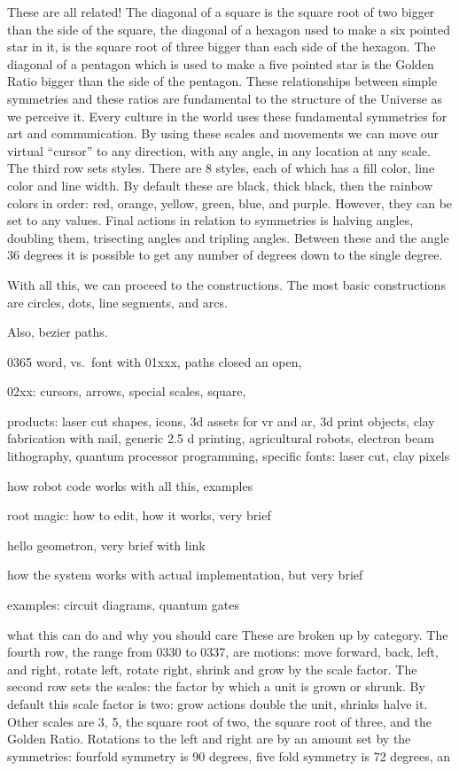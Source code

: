 \documentclass[12pt,a4paper]{amsart}
\numberwithin{equation}{section}
\begin{document}
These are all related! The diagonal of a square is the square root of
two bigger than the side of the square, the diagonal of a hexagon used
to make a six pointed star in it, is the square root of three bigger
than each side of the hexagon. The diagonal of a pentagon which is used
to make a five pointed star is the Golden Ratio bigger than the side of
the pentagon. These relationships between simple symmetries and these
ratios are fundamental to the structure of the Universe as we perceive
it. Every culture in the world uses these fundamental symmetries for art
and communication. By using these scales and movements we can move our
virtual ``cursor'' to any direction, with any angle, in any location at
any scale. The third row sets styles. There are 8 styles, each of which
has a fill color, line color and line width. By default these are black,
thick black, then the rainbow colors in order: red, orange, yellow,
green, blue, and purple. However, they can be set to any values. Final
actions in relation to symmetries is halving angles, doubling them,
trisecting angles and tripling angles. Between these and the angle 36
degrees it is possible to get any number of degrees down to the single
degree.

With all this, we can proceed to the constructions. The most basic
constructions are circles, dots, line segments, and arcs.

Also, bezier paths.

0365 word, vs.~font with 01xxx, paths closed an open,

02xx: cursors, arrows, special scales, square,

products: laser cut shapes, icons, 3d assets for vr and ar, 3d print
objects, clay fabrication with nail, generic 2.5 d printing,
agricultural robots, electron beam lithography, quantum processor
programming, specific fonts: laser cut, clay pixels

how robot code works with all this, examples

root magic: how to edit, how it works, very brief

hello geometron, very brief with link

how the system works with actual implementation, but very brief

examples: circuit diagrams, quantum gates

what this can do and why you should care These are broken up by
category. The fourth row, the range from 0330 to 0337, are motions: move
forward, back, left, and right, rotate left, rotate right, shrink and
grow by the scale factor. The second row sets the scales: the factor by
which a unit is grown or shrunk. By default this scale factor is two:
grow actions double the unit, shrinks halve it. Other scales are 3, 5,
the square root of two, the square root of three, and the Golden Ratio.
Rotations to the left and right are by an amount set by the symmetries:
fourfold symmetry is 90 degrees, five fold symmetry is 72 degrees, an
\end{document}
